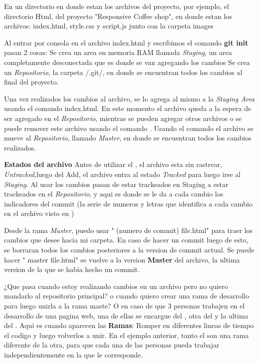 \documentclass[]{article} %
\begin{document}
En un directorio en donde estan los archivos del proyecto, por ejemplo, el directorio Html, del proyecto "Responsive Coffee shop", en donde estan los archivos: index.html, style.css y script.js junto con la carpeta images

Al entrar por consola en el archivo index.html y escribimos el comando \textbf{git init} pasan 2 cosas:
  Se crea un area en memoria RAM llamada \textit{Staging}, un area completamente desconectada que es donde se van agregando los cambios
  Se crea un \textit{Repositorio}, la carpeta /.git/, en donde se encuentran todos los cambios al final del proyecto.

Una vez realizados los cambios al archivo, se lo agrega al mismo a la \textit{Staging Area} usando el comando  index.html. En este momento el archivo queda a la espera de ser agregado en el \textit{Repositorio}, mientras se pueden agregar otros archivos o se puede remover este archivo usando el comando .
Usando el comando  el archivo se mueve al \textit{Repositorio}, llamado \textit{Master}, en donde se encuentran todos los cambios realizados.

\textbf{Estados del archivo}
Antes de utilizar el , el archivo esta sin rastrear, \textit{Untracked},luego del Add, el archivo entra al estado \textit{Tracked} para luego irse al \textit{Staging}. Al usar  los cambios pasan de estar trackeados en Staging a estar trackeados en el \textit{Repositorio}, y aqui es donde se le da a cada cambio los indicadores del commit (la serie de numeros y letras que identifica a cada cambio en el archivo visto en )

Desde la rama \textit{Master}, puedo usar " (numero de commit) file.html" para traer los cambios que desee hacia mi carpeta.
En caso de hacer un commit luego de esto, se borraran todos los cambios posteriores a la version de commit actual.
Se puede hacer " master file.html" se vuelve a la version \textbf{Master} del archivo, la ultima version de la que se habia hecho un commit.


¿Que pasa cuando estoy realizando cambios en un archivo pero no quiero mandarlo al repositorio principal? o cuando quiero crear una rama de desarrollo para luego unirla a la rama maste? O en caso de que 3 personas trabajen en el desarrollo de una pagina web, una de ellas se encargue del , otra del  y la ultima del .
Aqui es cuando aparecen las \textbf{Ramas}: Romper en diferentes lineas de tiempo el codigo y luego volverlos a unir. En el ejemplo anterior, tanto el  son una rama diferente de la otra, para que cada una de las personas pueda trabajar independientemente en la que le corresponde.
\end{document}

